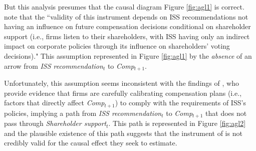 \documentclass[12pt,reqno,titlepage]{amsart}
\theoremstyle{definition}
\begin{document}
But this analysis presumes that the causal diagram Figure \ref{fig:agl1} is correct.
\citet[p.\,912]{Armstrong:2013io} note that the ``validity of this instrument depends on ISS recommendations not having an influence on future compensation decisions conditional on shareholder support (i.e., firms listen to their shareholders, with ISS having only an indirect impact on corporate policies through its influence on shareholders' voting decisions)."
This assumption represented in Figure \ref{fig:agl1} by the \emph{absence} of an arrow from \textit{ISS recommendation}$_t$ to \textit{Comp}$_{t+1}$.

Unfortunately, this assumption seems inconsistent with the findings of \citet{Gow:2013aa}, who provide evidence that firms are carefully calibrating compensation plans (i.e., factors that directly affect \textit{Comp}$_{t+1}$) to comply with the requirements of ISS's policies, implying a path from \textit{ISS recommendation}$_t$ to \textit{Comp}$_{t+1}$ that does not pass through \textit{Shareholder support}$_{t}$.
This path is represented in Figure \ref{fig:agl2} and the plausible existence of this path suggests that the instrument of \citet[p.\,912]{Armstrong:2013io} is not credibly valid for the causal effect they seek to estimate.
\end{document}
